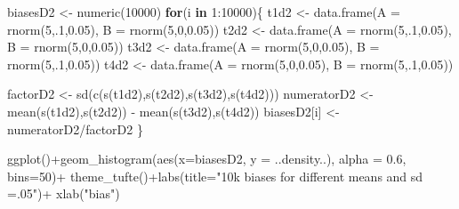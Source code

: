 \documentclass[
  10pt,
  dvipsnames,enabledeprecatedfontcommands]{scrartcl}
\newenvironment{Shaded}{\begin{snugshade}}{\end{snugshade}}
\newcommand{\AttributeTok}[1]{\textcolor[rgb]{0.77,0.63,0.00}{#1}}
\newcommand{\ControlFlowTok}[1]{\textcolor[rgb]{0.13,0.29,0.53}{\textbf{#1}}}
\newcommand{\DecValTok}[1]{\textcolor[rgb]{0.00,0.00,0.81}{#1}}
\newcommand{\FloatTok}[1]{\textcolor[rgb]{0.00,0.00,0.81}{#1}}
\newcommand{\FunctionTok}[1]{\textcolor[rgb]{0.00,0.00,0.00}{#1}}
\newcommand{\NormalTok}[1]{#1}
\newcommand{\OtherTok}[1]{\textcolor[rgb]{0.56,0.35,0.01}{#1}}
\newcommand{\SpecialCharTok}[1]{\textcolor[rgb]{0.00,0.00,0.00}{#1}}
\newcommand{\StringTok}[1]{\textcolor[rgb]{0.31,0.60,0.02}{#1}}
\begin{document}
\begin{Shaded}
\begin{Highlighting}[]
\NormalTok{biasesD2 }\OtherTok{\textless{}{-}} \FunctionTok{numeric}\NormalTok{(}\DecValTok{10000}\NormalTok{)}
\ControlFlowTok{for}\NormalTok{(i }\ControlFlowTok{in} \DecValTok{1}\SpecialCharTok{:}\DecValTok{10000}\NormalTok{)\{}
\NormalTok{t1d2 }\OtherTok{\textless{}{-}} \FunctionTok{data.frame}\NormalTok{(}\AttributeTok{A  =} \FunctionTok{rnorm}\NormalTok{(}\DecValTok{5}\NormalTok{,.}\DecValTok{1}\NormalTok{,}\FloatTok{0.05}\NormalTok{), }\AttributeTok{B =} \FunctionTok{rnorm}\NormalTok{(}\DecValTok{5}\NormalTok{,}\DecValTok{0}\NormalTok{,}\FloatTok{0.05}\NormalTok{))}
\NormalTok{t2d2 }\OtherTok{\textless{}{-}} \FunctionTok{data.frame}\NormalTok{(}\AttributeTok{A  =} \FunctionTok{rnorm}\NormalTok{(}\DecValTok{5}\NormalTok{,.}\DecValTok{1}\NormalTok{,}\FloatTok{0.05}\NormalTok{), }\AttributeTok{B =} \FunctionTok{rnorm}\NormalTok{(}\DecValTok{5}\NormalTok{,}\DecValTok{0}\NormalTok{,}\FloatTok{0.05}\NormalTok{))}
\NormalTok{t3d2 }\OtherTok{\textless{}{-}} \FunctionTok{data.frame}\NormalTok{(}\AttributeTok{A  =} \FunctionTok{rnorm}\NormalTok{(}\DecValTok{5}\NormalTok{,}\DecValTok{0}\NormalTok{,}\FloatTok{0.05}\NormalTok{), }\AttributeTok{B =} \FunctionTok{rnorm}\NormalTok{(}\DecValTok{5}\NormalTok{,.}\DecValTok{1}\NormalTok{,}\FloatTok{0.05}\NormalTok{))}
\NormalTok{t4d2 }\OtherTok{\textless{}{-}} \FunctionTok{data.frame}\NormalTok{(}\AttributeTok{A  =} \FunctionTok{rnorm}\NormalTok{(}\DecValTok{5}\NormalTok{,}\DecValTok{0}\NormalTok{,}\FloatTok{0.05}\NormalTok{), }\AttributeTok{B =} \FunctionTok{rnorm}\NormalTok{(}\DecValTok{5}\NormalTok{,.}\DecValTok{1}\NormalTok{,}\FloatTok{0.05}\NormalTok{))}

\NormalTok{factorD2 }\OtherTok{\textless{}{-}} \FunctionTok{sd}\NormalTok{(}\FunctionTok{c}\NormalTok{(}\FunctionTok{s}\NormalTok{(t1d2),}\FunctionTok{s}\NormalTok{(t2d2),}\FunctionTok{s}\NormalTok{(t3d2),}\FunctionTok{s}\NormalTok{(t4d2)))}
\NormalTok{numeratorD2 }\OtherTok{\textless{}{-}}  \FunctionTok{mean}\NormalTok{(}\FunctionTok{s}\NormalTok{(t1d2),}\FunctionTok{s}\NormalTok{(t2d2)) }\SpecialCharTok{{-}} \FunctionTok{mean}\NormalTok{(}\FunctionTok{s}\NormalTok{(t3d2),}\FunctionTok{s}\NormalTok{(t4d2))}
\NormalTok{biasesD2[i] }\OtherTok{\textless{}{-}}\NormalTok{ numeratorD2}\SpecialCharTok{/}\NormalTok{factorD2}
\NormalTok{\}}

\FunctionTok{ggplot}\NormalTok{()}\SpecialCharTok{+}\FunctionTok{geom\_histogram}\NormalTok{(}\FunctionTok{aes}\NormalTok{(}\AttributeTok{x=}\NormalTok{biasesD2, }\AttributeTok{y =}\NormalTok{ ..density..), }\AttributeTok{alpha =} \FloatTok{0.6}\NormalTok{, }\AttributeTok{bins=}\DecValTok{50}\NormalTok{)}\SpecialCharTok{+}
  \FunctionTok{theme\_tufte}\NormalTok{()}\SpecialCharTok{+}\FunctionTok{labs}\NormalTok{(}\AttributeTok{title=}\StringTok{"10k biases for different means and sd =.05"}\NormalTok{)}\SpecialCharTok{+} \FunctionTok{xlab}\NormalTok{(}\StringTok{"bias"}\NormalTok{)}
\end{Highlighting}
\end{Shaded}
\end{document}
